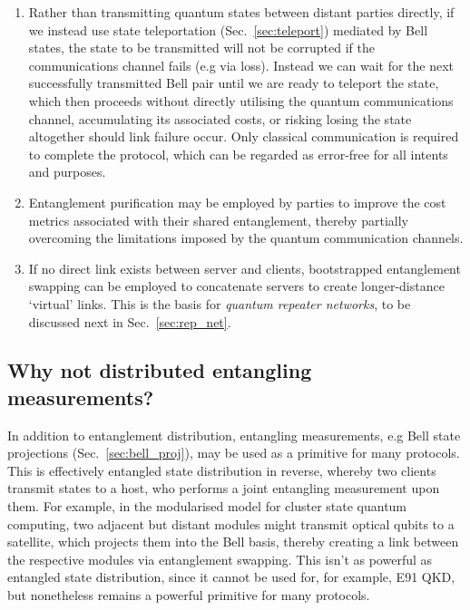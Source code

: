 \begin{enumerate}
\item Rather than transmitting quantum states between distant parties directly, if we instead use state teleportation (Sec.~\ref{sec:teleport}) mediated by Bell states, the state to be transmitted will not be corrupted if the communications channel fails (e.g via loss). Instead we can wait for the next successfully transmitted Bell pair until we are ready to teleport the state, which then proceeds without directly utilising the quantum communications channel, accumulating its associated costs, or risking losing the state altogether should link failure occur. Only classical communication is required to complete the protocol, which can be regarded as error-free for all intents and purposes.
\item Entanglement purification may be employed by parties to improve the cost metrics associated with their shared entanglement, thereby partially overcoming the limitations imposed by the quantum communication channels.
\item If no direct link exists between server and clients, bootstrapped entanglement swapping can be employed to concatenate servers to create longer-distance `virtual' links. This is the basis for \textit{quantum repeater networks}, to be discussed next in Sec.~\ref{sec:rep_net}.
\end{enumerate}


%
%

\subsection{Why not distributed entangling measurements?}

In addition to entanglement distribution, entangling measurements, e.g Bell state projections (Sec.~\ref{sec:bell_proj}), may be used as a primitive for many protocols. This is effectively entangled state distribution in reverse, whereby two clients transmit states to a host, who performs a joint entangling measurement upon them. For example, in the modularised model for cluster state quantum computing, two adjacent but distant modules might transmit optical qubits to a satellite, which projects them into the Bell basis, thereby creating a link between the respective modules via entanglement swapping. This isn't as powerful as entangled state distribution, since it cannot be used for, for example, E91 QKD, but nonetheless remains a powerful primitive for many protocols.

